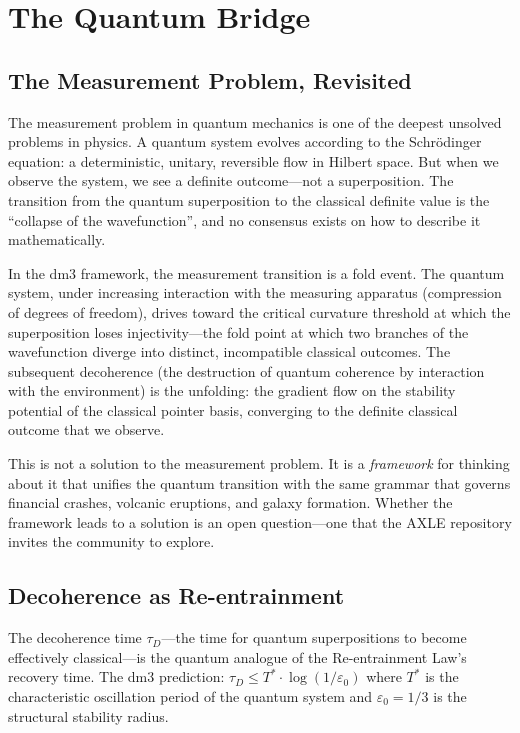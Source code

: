 \documentclass[12pt, oneside]{book}
\theoremstyle{plain}
\theoremstyle{definition}
\theoremstyle{remark}
\begin{document}
\chapter{The Quantum Bridge}
\label{ch:quantum}

\section{The Measurement Problem, Revisited}

The measurement problem in quantum mechanics is one of the
deepest unsolved problems in physics. A quantum system evolves
according to the Schrödinger equation: a deterministic, unitary,
reversible flow in Hilbert space. But when we observe the system,
we see a definite outcome---not a superposition. The transition
from the quantum superposition to the classical definite value
is the ``collapse of the wavefunction'', and no consensus exists
on how to describe it mathematically.

In the dm3 framework, the measurement transition is a fold event.
The quantum system, under increasing interaction with the measuring
apparatus (compression of degrees of freedom), drives toward
the critical curvature threshold at which the superposition
loses injectivity---the fold point at which two branches
of the wavefunction diverge into distinct, incompatible
classical outcomes. The subsequent decoherence (the destruction
of quantum coherence by interaction with the environment) is
the unfolding: the gradient flow on the stability potential
of the classical pointer basis, converging to the definite
classical outcome that we observe.

This is not a solution to the measurement problem. It is a
\emph{framework} for thinking about it that unifies the
quantum transition with the same grammar that governs financial
crashes, volcanic eruptions, and galaxy formation. Whether the
framework leads to a solution is an open question---one that
the AXLE repository invites the community to explore.

\section{Decoherence as Re-entrainment}

The decoherence time $\tau_D$---the time for quantum superpositions
to become effectively classical---is the quantum analogue of
the Re-entrainment Law's recovery time. The dm3 prediction:
$\tau_D \leq T^* \cdot \log(1/\varepsilon_0)$ where $T^*$
is the characteristic oscillation period of the quantum system
and $\varepsilon_0 = 1/3$ is the structural stability radius.
\end{document}
